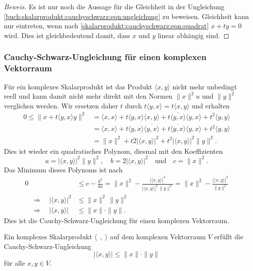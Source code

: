 \begin{proof}[Beweis]
Es ist nur noch die Aussage für die Gleichheit in der Ungleichung
\eqref{buch:skalarprodukt:cauchyschwarz:eqn:ungleichung}
zu beweisen.
Gleichheit kann nur eintreten, wenn nach
\eqref{skalarprodukt:cauchyschwarz:eqn:quadrat}
$x+ty=0$ wird.
Dies ist gleichbedeutend damit, dass $x$ und $y$ linear abhängig sind.
\end{proof}

%
%
\subsubsection{Cauchy-Schwarz-Ungleichung für einen komplexen Vektorraum}
Für ein komplexes Skalarprodukt ist das Produkt $\langle x,y\rangle$
nicht mehr unbedingt reell und kann damit nicht mehr direkt mit den
Normen $\|x\|^2u$ und $\|y\|^2$ verglichen werden.
Wir ersetzen daher $t$ durch
$t\langle y,x\rangle=t\overline{\langle x,y\rangle}$
und erhalten 
\begin{align*}
0
\le
\|x+t\langle y,x\rangle y\|^2
&=
\langle x,x\rangle
+t\langle y,x\rangle \langle x,y\rangle
+t\overline{\langle y,x\rangle}\langle y,x\rangle
+t^2\langle y,y\rangle
\\
&=
\langle x,x\rangle
+t\langle y,x\rangle \overline{\langle y,x\rangle}
+t\overline{\langle y,x\rangle}\langle y,x\rangle
+t^2\langle y,y\rangle
\\
&=
\|x\|^2
+
t
2|\langle x,y\rangle|^2
+
t^2 |\langle x,y\rangle|^2
\|y\|^2.
\end{align*}
Dies ist wieder ein quadratisches Polynom, diesmal mit den Koeffizienten
\[
a= |\langle x,y\rangle|^2 \|y\|^2,
\quad
b= 2|\langle x,y\rangle|^2
\quad\text{und}\quad
c= \|x\|^2.
\]
Das Minimum dieses Polynoms ist nach
\begin{align*}
0
&\le
c-\frac{b^2}{4a}
=
\|x\|^2 - \frac{|\langle x,y\rangle|^4}{|\langle x,y\rangle|^2\,\|y\|^2}
=
\|x\|^2 - \frac{|\langle x,y\rangle|^2}{\|y\|^2}
\\
\quad\Rightarrow\quad
|\langle x,y\rangle|^2 &\le \|x\|^2\,\|y\|^2
\\
\quad\Rightarrow\quad
|\langle x,y\rangle|&\le \|x\|\cdot\|y\|.
\end{align*}
Dies ist die Cauchy-Schwarz-Ungleichung für einen komplexen Vektorraum.

\begin{satz}
\label{buch:skalarprodukt:cauchy-schwarz:satz:komplex}
Ein komplexes Skalarprodukt $\langle\;\,,\;\rangle$ auf dem komplexen Vektorraum
$V$ erfüllt die Cauchy-Schwarz-Ungleichung
%
\[
|\langle x, y\rangle| \le \|x\|\cdot\|y\|
\]
für alle $x,y\in V$.
\end{satz}

